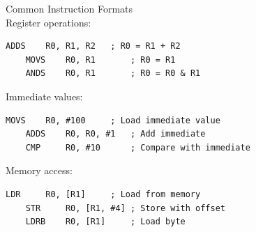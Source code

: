 \begin{example2}{Common Instruction Formats}\\
Register operations:
\begin{lstlisting}[language=armasm, style=base]
    ADDS    R0, R1, R2   ; R0 = R1 + R2
    MOVS    R0, R1       ; R0 = R1
    ANDS    R0, R1       ; R0 = R0 & R1
\end{lstlisting}

Immediate values:
\begin{lstlisting}[language=armasm, style=base]
    MOVS    R0, #100     ; Load immediate value
    ADDS    R0, R0, #1   ; Add immediate
    CMP     R0, #10      ; Compare with immediate
\end{lstlisting}

Memory access:
\begin{lstlisting}[language=armasm, style=base]
    LDR     R0, [R1]     ; Load from memory
    STR     R0, [R1, #4] ; Store with offset
    LDRB    R0, [R1]     ; Load byte
\end{lstlisting}
\end{example2}

